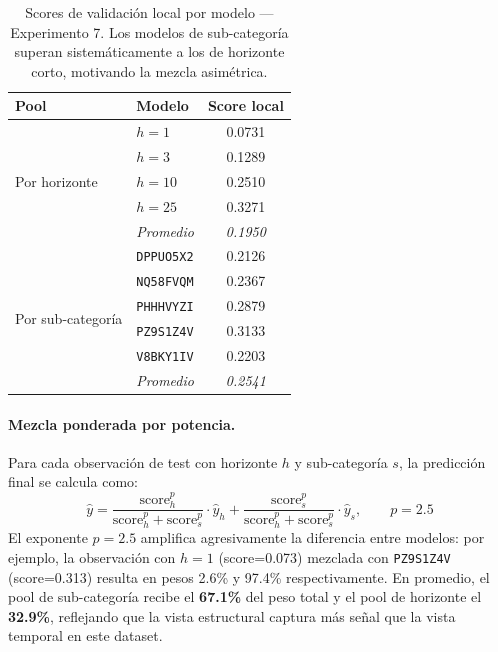 \documentclass{article}
\begin{document}
\begin{table}[h!]
  \caption{Scores de validación local por modelo — Experimento 7. Los modelos de sub-categoría superan sistemáticamente a los de horizonte corto, motivando la mezcla asimétrica.}
  \label{tab:exp7_scores}
  \centering
  \begin{tabular}{llc}
    \toprule
    Pool & Modelo & Score local \\
    \midrule
    \multirow{5}{*}{Por horizonte}
      & $h=1$   & 0.0731 \\
      & $h=3$   & 0.1289 \\
      & $h=10$  & 0.2510 \\
      & $h=25$  & 0.3271 \\
      & \textit{Promedio} & \textit{0.1950} \\
    \midrule
    \multirow{6}{*}{Por sub-categoría}
      & \texttt{DPPUO5X2} & 0.2126 \\
      & \texttt{NQ58FVQM} & 0.2367 \\
      & \texttt{PHHHVYZI} & 0.2879 \\
      & \texttt{PZ9S1Z4V} & 0.3133 \\
      & \texttt{V8BKY1IV} & 0.2203 \\
      & \textit{Promedio} & \textit{0.2541} \\
    \bottomrule
  \end{tabular}
\end{table}

\paragraph{Mezcla ponderada por potencia.}
Para cada observación de test con horizonte $h$ y sub-categoría $s$, la predicción final se calcula como:
\begin{equation}
  \hat{y} = \frac{\text{score}_h^{p}}{\text{score}_h^{p} + \text{score}_s^{p}} \cdot \hat{y}_h
          + \frac{\text{score}_s^{p}}{\text{score}_h^{p} + \text{score}_s^{p}} \cdot \hat{y}_s, \qquad p = 2.5
  \label{eq:power_blend}
\end{equation}
El exponente $p=2.5$ amplifica agresivamente la diferencia entre modelos: por ejemplo, la observación con $h=1$ (score=0.073) mezclada con \texttt{PZ9S1Z4V} (score=0.313) resulta en pesos 2.6\% y 97.4\% respectivamente. En promedio, el pool de sub-categoría recibe el \textbf{67.1\%} del peso total y el pool de horizonte el \textbf{32.9\%}, reflejando que la vista estructural captura más señal que la vista temporal en este dataset.
\end{document}
